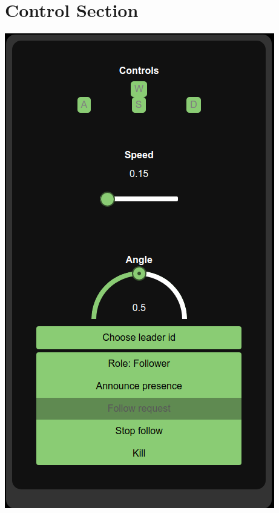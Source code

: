 \documentclass[12pt]{article}
\begin{document}
\section{Control Section}
\noindent
\begin{minipage}[t]{0.49\textwidth}
    \vspace{0pt} 
	\includegraphics[width=\linewidth]{Images/control_section.png}
	\label{fig:control section}
\end{minipage}%
\end{document}
